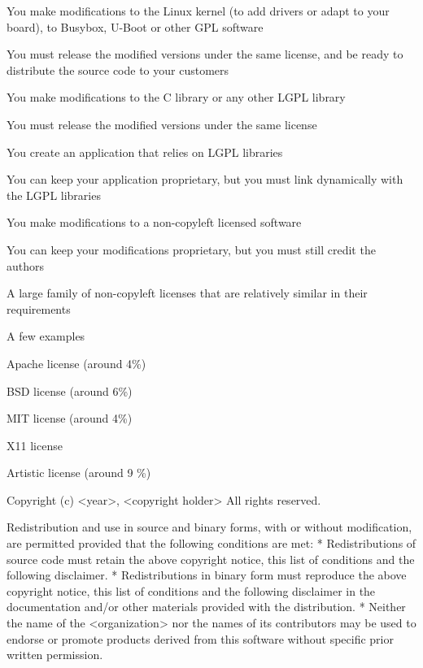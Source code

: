   \startitemize
  \item You make modifications to the Linux kernel (to add drivers or
    adapt to your board), to Busybox, U-Boot or other GPL software
    \startitemize
    \item You must release the modified versions under the same
      license, and be ready to distribute the source code to your
      customers
    \stopitemize
  \item You make modifications to the C library or any other LGPL
    library
    \startitemize
    \item You must release the modified versions under the same
      license
    \stopitemize
  \item You create an application that relies on LGPL libraries
    \startitemize
    \item You can keep your application proprietary, but you must link
      dynamically with the LGPL libraries
    \stopitemize
  \item You make modifications to a non-copyleft licensed software
    \startitemize
    \item You can keep your modifications proprietary, but you must
      still credit the authors
    \stopitemize
  \stopitemize

  \startitemize
  \item A large family of non-copyleft licenses that are relatively
    similar in their requirements
  \item A few examples
    \startitemize
    \item Apache license (around 4\%)
    \item BSD license (around 6\%)
    \item MIT license (around 4\%)
    \item X11 license
    \item Artistic license (around 9 \%)
    \stopitemize
  \stopitemize

  \starttyping
Copyright (c) <year>, <copyright holder>
All rights reserved.

Redistribution and use in source and binary forms, with or without
modification, are permitted provided that the following conditions are
met:
* Redistributions of source code must retain the above copyright
  notice, this list of conditions and the following disclaimer.
* Redistributions in binary form must reproduce the above copyright
  notice, this list of conditions and the following disclaimer in the
  documentation and/or other materials provided with the distribution.
* Neither the name of the <organization> nor the names of its
  contributors may be used to endorse or promote products derived from
  this software without specific prior written permission.

